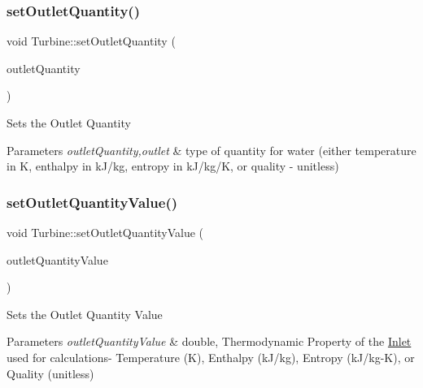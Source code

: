 \subsubsection{\texorpdfstring{set\+Outlet\+Quantity()}{setOutletQuantity()}\hspace{0.1cm}{\footnotesize\ttfamily [3/3]}}
{\footnotesize\ttfamily void Turbine\+::set\+Outlet\+Quantity (\begin{DoxyParamCaption}\item[{\hyperlink{class_steam_properties_ae0294bedf7d178c2d8fb6aed0f62fbff}{Steam\+Properties\+::\+Thermodynamic\+Quantity}}]{outlet\+Quantity }\end{DoxyParamCaption})}

Sets the Outlet Quantity


\begin{DoxyParams}{Parameters}
{\em outlet\+Quantity,outlet} & type of quantity for water (either temperature in K, enthalpy in k\+J/kg, entropy in k\+J/kg/K, or quality -\/ unitless) \\
\hline
\end{DoxyParams}
\mbox{\label{class_turbine_ab37326068f633280de8f8144b9c8eb89}} 
\subsubsection{\texorpdfstring{set\+Outlet\+Quantity\+Value()}{setOutletQuantityValue()}\hspace{0.1cm}{\footnotesize\ttfamily [1/3]}}
{\footnotesize\ttfamily void Turbine\+::set\+Outlet\+Quantity\+Value (\begin{DoxyParamCaption}\item[{double}]{outlet\+Quantity\+Value }\end{DoxyParamCaption})}

Sets the Outlet Quantity Value


\begin{DoxyParams}{Parameters}
{\em outlet\+Quantity\+Value} & double, Thermodynamic Property of the \hyperlink{class_inlet}{Inlet} used for calculations-\/ Temperature (K), Enthalpy (k\+J/kg), Entropy (k\+J/kg-\/K), or Quality (unitless) \\
\hline
\end{DoxyParams}
\mbox{\label{class_turbine_ab37326068f633280de8f8144b9c8eb89}} 
